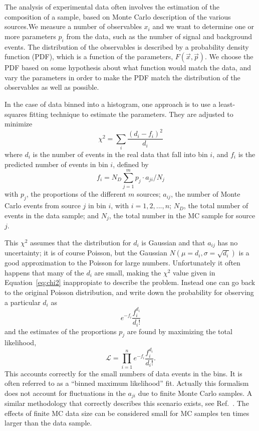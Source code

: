 The analysis of experimental data often involves the estimation of the composition of a sample, based on Monte Carlo description of the various sources.We measure a number of observables $x_i$ and we want to determine one or more parameters $p_i$ from the data, such as the number of signal and background events. The distribution  of the observables is described by a probability density function (PDF), which is a function of %
the parameters, $F(\vec{x},\vec{p})$.  We choose the PDF based on some hypothesis about what function would match the data, and vary the parameters in order to make the PDF match the distribution of the observables as well as possible. 


In the case of data binned into a histogram, one approach is to use a least-squares fitting technique to estimate the parameters. They are adjusted to minimize
%
\begin{equation}
\chi^2 = \sum_i \frac{(d_i - f_i)^2}{d_i}
 \label{eq:chi2}
\end{equation}
%
where $d_i$ is the number of events in the real data that fall into bin $i$, and $f_i$ is the predicted number of events in bin $i$, defined by
%
\begin{equation}
f_i = N_D\sum^m_{j=1} p_j \cdot a_{ji}/N_j
\end{equation}
%
with $p_j$, the proportions of the different $m$ sources; $a_{ij}$, the number of Monte Carlo events from source $j$ in bin $i$, with $i=1,2,...,n$; $N_D$, the total number of events in the data sample; and $N_j$, the total number in the MC sample for source $j$.

This $\chi^2$ assumes that the distribution for $d_i$ is Gaussian and that $a_{ij}$ has no uncertainty; it is of course Poisson, but the Gaussian $N(\mu = d_i,\sigma = \sqrt{d_i})$ is a good approximation to the Poisson for large numbers. Unfortunately it often happens that many of the $d_i$ are small, making the $\chi^2$ value given in Equation~\ref{eq:chi2} inappropiate to describe the problem.  Instead one can go back to the original Poisson distribution, and write down the probability for observing a particular $d_i$ as
%
\begin{equation}
e^{-f_i} \frac{f_i^{d_i}}{d_i!} 
\end{equation}
%
and the estimates of the proportions $p_j$ are found by maximizing the total likelihood, 
%
\begin{equation}
\mathcal{L} = \prod^n_{i=1} e^{-f_i} \frac{f_i^{d_i}}{d_i!}.
\end{equation}
%
This accounts correctly for the small numbers of data events in the bins.  It is often referred to as a ``binned maximum likelihood'' fit. Actually this formalism does not account for fluctuations in the $a_{ji}$ due to finite Monte Carlo samples. A similar methodology that correctly describes this scenario exists, see Ref.~\cite{Barlow1993219}. The effects of finite MC data size can be considered small for MC samples ten times larger than the data sample. 


